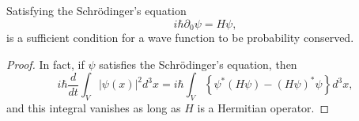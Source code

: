 \begin{theorem}
Satisfying the Schr\"{o}dinger's equation
\begin{equation}
i\hbar\partial_0\psi=H\psi,
\end{equation}
is a sufficient condition for a wave function to be probability conserved.
\end{theorem}
\begin{proof}
In fact, if $\psi$ satisfies the Schr\"{o}dinger's equation, then
\begin{equation}
i\hbar\frac{d}{dt}\int_V|\psi(x)|^2d^3x=i\hbar\int_V\left\{\psi^*(H\psi)-(H\psi)^*\psi\right\}d^3x,
\end{equation}
and this integral vanishes as long as $H$ is a Hermitian operator.
\end{proof}



